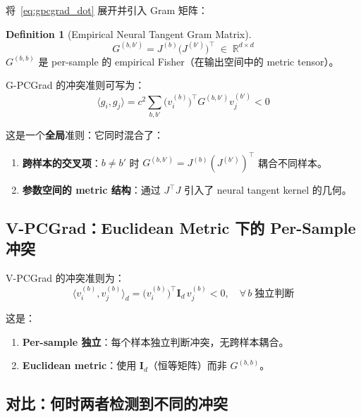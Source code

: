 \documentclass[11pt,a4paper]{article}
\newcommand{\R}{\mathbb{R}}
\theoremstyle{definition}
\newtheorem{definition}{Definition}
\begin{document}
将~\eqref{eq:gpcgrad_dot} 展开并引入 Gram 矩阵：

\begin{definition}[Empirical Neural Tangent Gram Matrix]
\begin{equation}
G^{(b,b')} = J^{(b)}\bigl(J^{(b')}\bigr)^\top \;\in\;\R^{d \times d}
\end{equation}
$G^{(b,b)}$ 是 per-sample 的 empirical Fisher（在输出空间中的 metric tensor）。
\end{definition}

G-PCGrad 的冲突准则可写为：
\begin{equation}
\boxed{
\langle g_i, g_j \rangle = c^2 \sum_{b,b'} \bigl(v_i^{(b)}\bigr)^\top G^{(b,b')} v_j^{(b')} < 0
}
\label{eq:conflict_G}
\end{equation}

这是一个\textbf{全局}准则：它同时混合了：
\begin{enumerate}[leftmargin=1.5em]
\item \textbf{跨样本的交叉项}：$b \neq b'$ 时 $G^{(b,b')} = J^{(b)}(J^{(b')})^\top$ 耦合不同样本。
\item \textbf{参数空间的 metric 结构}：通过 $J^\top J$ 引入了 neural tangent kernel 的几何。
\end{enumerate}

\subsection{V-PCGrad：Euclidean Metric 下的 Per-Sample 冲突}

V-PCGrad 的冲突准则为：
\begin{equation}
\boxed{
\langle v_i^{(b)}, v_j^{(b)}\rangle_d = \bigl(v_i^{(b)}\bigr)^\top \bm{I}_d\, v_j^{(b)} < 0, \quad \forall\, b \;\text{独立判断}
}
\label{eq:conflict_V}
\end{equation}

这是：
\begin{enumerate}[leftmargin=1.5em]
\item \textbf{Per-sample 独立}：每个样本独立判断冲突，无跨样本耦合。
\item \textbf{Euclidean metric}：使用 $\bm{I}_d$（恒等矩阵）而非 $G^{(b,b)}$。
\end{enumerate}

\subsection{对比：何时两者检测到不同的冲突}
\end{document}

